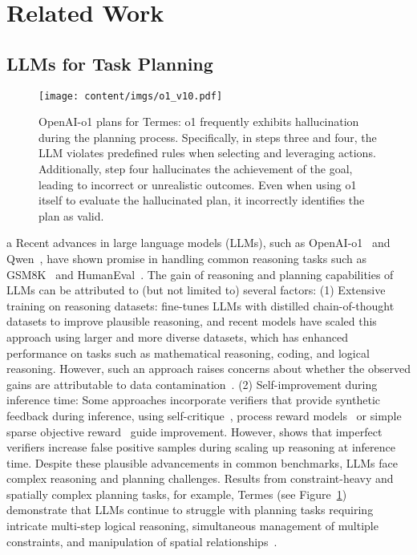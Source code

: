 \section{Related Work}
\subsection{LLMs for Task Planning}

\begin{figure}[!t]
    \centering
    \texttt{[image: content/imgs/o1\_v10.pdf]} 
    \vspace{-7mm}
    \caption{\small OpenAI-o1 plans for Termes: o1 frequently exhibits hallucination during the planning process. Specifically, in steps three and four, the LLM violates predefined rules when selecting and leveraging actions. Additionally, step four hallucinates the achievement of the goal, leading to incorrect or unrealistic outcomes. Even when using o1 itself to evaluate the hallucinated plan, it incorrectly identifies the plan as valid. 
    }
    \label{o1-plan}
\end{figure}
 a 
Recent advances in large language models (LLMs), such as OpenAI-o1~\cite{zeng2024scaling} and Qwen~\cite{yang2024qwen2}, have shown promise in handling common reasoning tasks such as GSM8K~\cite{cobbe2021gsm8k} and HumanEval~\cite{chen2021evaluating}.
The gain of reasoning and planning capabilities of LLMs can be attributed to (but not limited to) several factors:
(1) Extensive training on reasoning datasets: \cite{yu2024distilling} fine-tunes LLMs with distilled chain-of-thought datasets to improve plausible reasoning, and recent models have scaled this approach using larger and more diverse datasets, which has enhanced performance on tasks such as mathematical reasoning, coding, and logical reasoning. 
However, such an approach raises concerns about whether the observed gains are attributable to data contamination~\cite{stroebl2024inference, Mirzadeh2024}.
(2) Self-improvement during inference time: Some approaches incorporate verifiers that provide synthetic feedback during inference, using self-critique~\cite{xiao2024verbalized}, process reward models~\cite{zhang2024generative} or simple sparse objective reward~\cite{zheng2023judging} guide improvement.
However, \cite{stroebl2024inference} shows that imperfect verifiers increase false positive samples during scaling up reasoning at inference time. 
Despite these plausible advancements in common benchmarks, LLMs face complex reasoning and planning challenges.
Results from constraint-heavy and spatially complex planning tasks, for example, Termes (see Figure~\ref{o1-plan}) demonstrate that LLMs continue to struggle with planning tasks requiring intricate multi-step logical reasoning, simultaneous management of multiple constraints, and manipulation of spatial relationships~\cite{valmeekam2024planbench, wang2024planning,qiu2025sgpbench}. 

